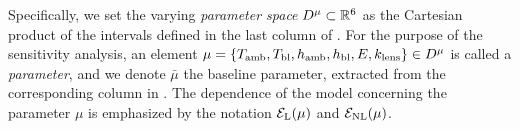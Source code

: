 Specifically, we set the varying \emph{parameter space} $D^{\mu}\subset\mathbb{R}^6$ as the Cartesian product of the intervals defined in the last column of .
For the purpose of the sensitivity analysis, an element $\mu=\{T_\text{amb}, T_\text{bl}, h_\text{amb}, h_\text{bl}, E, k_\text{lens}\}\in D^{\mu}$ is called a \emph{parameter},
and we denote $\bar{\mu}$ the baseline parameter, extracted from the corresponding column in .
The dependence of the model concerning the parameter $\mu$ is emphasized by the notation $\mathcal{E}_\text{L}(\mu)$ and $\mathcal{E}_\text{NL}(\mu)$.


